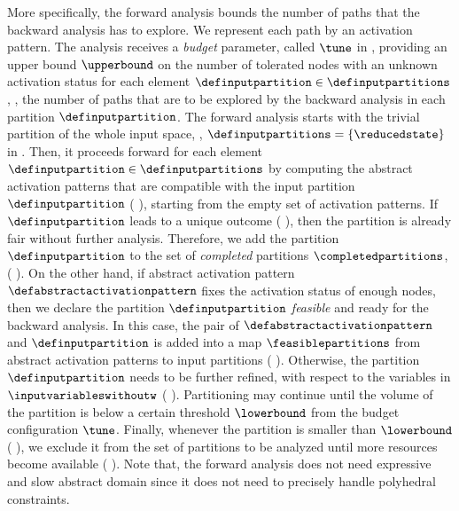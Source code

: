 {More specifically, the forward analysis bounds the number of paths that the backward analysis has to explore.
We represent each path by an activation pattern.
The analysis receives a \emph{budget} parameter, called $\tune$ in , providing an upper bound $\upperbound$ on the number of tolerated \relu{} nodes with an unknown activation status for each element $\definputpartition\in\definputpartitions$, \ie, the number of paths that are to be explored by the backward analysis in each partition $\definputpartition$.
The forward analysis starts with the trivial partition of the whole input space, \ie, $\definputpartitions = \{\reducedstate\}$ in .
Then, it proceeds forward for each element $\definputpartition\in\definputpartitions$ by computing the abstract activation patterns that are compatible with the input partition $\definputpartition$ (\cf{} ), starting from the empty set of activation patterns. If $\definputpartition$ leads to a unique outcome (\cf{} ), then the partition is already fair without further analysis.
Therefore, we add the partition $\definputpartition$ to the set of \emph{completed} partitions $\completedpartitions$, (\cf{} ).
On the other hand, if abstract activation pattern $\defabstractactivationpattern$ fixes the activation status of enough \relu{} nodes, then we declare the partition $\definputpartition$ \emph{feasible} and ready for the backward analysis.
In this case, the pair of $\defabstractactivationpattern$ and $\definputpartition$ is added into a map $\feasiblepartitions$ from abstract activation patterns to input partitions (\cf{} ).
Otherwise, the partition $\definputpartition$ needs to be further refined, with respect to the variables in $\inputvariableswithoutw$ (\cf{} ).
Partitioning may continue until the volume of the partition is below a certain threshold $\lowerbound$ from the budget configuration $\tune$.
Finally, whenever the partition is smaller than $\lowerbound$ (\cf{} ), we exclude it from the set of partitions to be analyzed until more resources become available (\cf{} ).
Note that, the forward analysis does not need expressive and slow abstract domain since it does not need to precisely handle polyhedral constraints.

}
